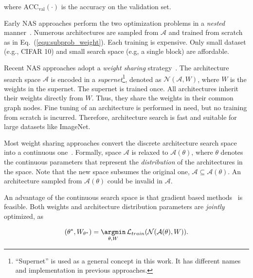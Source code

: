 where $\text{ACC}_\text{val}(\cdot)$ is the accuracy on the validation set.

Early NAS approaches perform the two optimization problems in a \emph{nested} manner~\cite{zoph2016neural,zoph2018learning,zhong2018practical,zhong2018blockqnn,baker2016designing}. Numerous architectures are sampled from $\mathcal{A}$ and trained from scratch as in Eq.~(\ref{equ:subprob_weight}). Each training is expensive. Only small dataset (e.g., CIFAR 10) and small search space (e.g, a single block) are affordable.

Recent NAS approaches adopt a \emph{weight sharing} strategy~\cite{cai2018proxylessnas,liu2018darts,wu2018fbnet,xie2018snas,bender2018understanding,brock2017smash,zhang2018you,pham2018efficient}. The architecture search space $\mathcal{A}$ is encoded in a \emph{supernet}\footnote{``Supernet'' is used as a general concept in this work. It has different names and implementation in previous approaches.}, denoted as $\mathcal{N}(\mathcal{A},W)$, where $W$ is the weights in the supernet. The supernet is trained once. All architectures inherit their weights directly from $W$. Thus, they share the weights in their common graph nodes. Fine tuning of an architecture is performed in need, but no training from scratch is incurred. Therefore, architecture search is fast and suitable for large datasets like ImageNet.

Most weight sharing approaches convert the discrete architecture search space into a continuous one~\cite{wu2018fbnet,cai2018proxylessnas,liu2018darts,xie2018snas,zhang2018you}. Formally, space $\mathcal{A}$ is relaxed to $\mathcal{A}(\theta)$, where $\theta$ denotes the continuous parameters that represent the \emph{distribution} of the architectures in the space. Note that the new space subsumes the original one, $\mathcal{A}\subseteq\mathcal{A}(\theta)$. An architecture sampled from $\mathcal{A}(\theta)$ could be invalid in $\mathcal{A}$.

An advantage of the continuous search space is that gradient based methods~\cite{liu2018darts,cai2018proxylessnas,wu2018fbnet,veniat2018learning,xie2018snas,zhang2018you} is feasible. Both weights and architecture distribution parameters are \emph{jointly} optimized, as

\begin{equation}
(\theta^*, W_{\theta^*})= \mathop{\argmin}_{\theta, W}\mathcal{L}_{train}(\mathcal{N}(\mathcal{A}(\theta), W)).
\label{equ:joint_arch_and_weight}
\end{equation}

